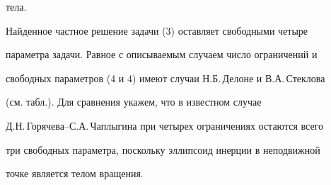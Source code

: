 тела.





Найденное частное решение задачи (3) оставляет свободными четыре


параметра задачи. Равное с описываемым случаем число ограничений и


свободных параметров (4 и 4) имеют случаи Н.Б.\,Делоне и В.А.\,Стеклова


(см. табл.). Для сравнения укажем, что в известном случае


Д.Н.\,Горячева--С.А.\,Чаплыгина при четырех ограничениях остаются всего


три свободных параметра, поскольку эллипсоид инерции в неподвижной


точке является телом вращения.





